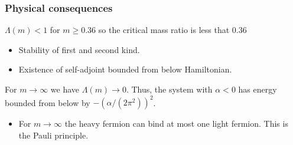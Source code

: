 \documentclass{beamer}[10]
\begin{document}
\begin{frame}
	\frametitle{Physical consequences}
	$ \Lambda(m)<1 $ for $ m\geq0.36 $ so the critical mass ratio is less that $ 0.36 $
	\begin{itemize}
		\item Stability of first and second kind.
		\item Existence of self-adjoint bounded from below Hamiltonian.
		\end{itemize}
		
		 For $ m\to\infty $ we have $ \Lambda(m)\to 0 $. Thus, the system with $ \alpha<0 $ has energy bounded from below by $ -\left(\alpha/(2\pi^2)\right)^2 $.
		 \begin{itemize} 
		\item For $ m\to\infty $ the heavy fermion can bind at most one light fermion. This is the Pauli principle.
	\end{itemize}
\end{frame}
\end{document}
